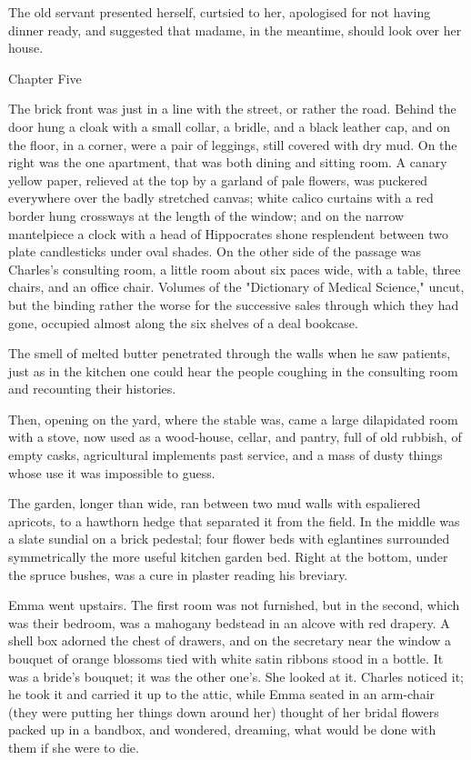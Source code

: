 \documentclass[11pt,twocolumn]{ltugboat}
\begin{document}
The old servant presented herself, curtsied to her, apologised for not
having dinner ready, and suggested that madame, in the meantime, should
look over her house.



Chapter Five

The brick front was just in a line with the street, or rather the road.
Behind the door hung a cloak with a small collar, a bridle, and a black
leather cap, and on the floor, in a corner, were a pair of leggings,
still covered with dry mud. On the right was the one apartment, that was
both dining and sitting room. A canary yellow paper, relieved at the
top by a garland of pale flowers, was puckered everywhere over the badly
stretched canvas; white calico curtains with a red border hung crossways
at the length of the window; and on the narrow mantelpiece a clock with
a head of Hippocrates shone resplendent between two plate candlesticks
under oval shades. On the other side of the passage was Charles's
consulting room, a little room about six paces wide, with a table,
three chairs, and an office chair. Volumes of the "Dictionary of Medical
Science," uncut, but the binding rather the worse for the successive
sales through which they had gone, occupied almost along the six shelves
of a deal bookcase.

The smell of melted butter penetrated through the walls when he saw
patients, just as in the kitchen one could hear the people coughing in
the consulting room and recounting their histories.

Then, opening on the yard, where the stable was, came a large
dilapidated room with a stove, now used as a wood-house, cellar, and
pantry, full of old rubbish, of empty casks, agricultural implements
past service, and a mass of dusty things whose use it was impossible to
guess.

The garden, longer than wide, ran between two mud walls with espaliered
apricots, to a hawthorn hedge that separated it from the field. In the
middle was a slate sundial on a brick pedestal; four flower beds with
eglantines surrounded symmetrically the more useful kitchen garden bed.
Right at the bottom, under the spruce bushes, was a cure in plaster
reading his breviary.

Emma went upstairs. The first room was not furnished, but in the second,
which was their bedroom, was a mahogany bedstead in an alcove with red
drapery. A shell box adorned the chest of drawers, and on the secretary
near the window a bouquet of orange blossoms tied with white satin
ribbons stood in a bottle. It was a bride's bouquet; it was the other
one's. She looked at it. Charles noticed it; he took it and carried it
up to the attic, while Emma seated in an arm-chair (they were putting
her things down around her) thought of her bridal flowers packed up in
a bandbox, and wondered, dreaming, what would be done with them if she
were to die.
\end{document}
